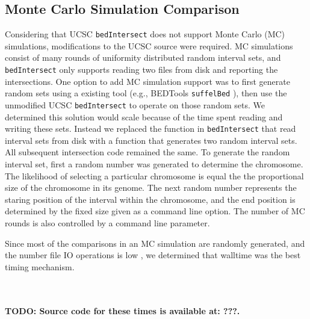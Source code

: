 \subsection{Monte Carlo Simulation Comparison}
Considering that UCSC {\tt bedIntersect} does not support Monte Carlo (MC)
simulations, modifications to the UCSC source were required.  MC simulations
consist of many rounds of uniformity distributed random interval sets, and
{\tt bedIntersect} only supports reading two files from disk and reporting the
intersections.  One option to add MC simulation support was to first generate
random sets using a existing tool (e.g., BEDTools {\tt suffelBed} ), then use
the unmodified UCSC {\tt bedIntersect} to operate on those random sets.  We
determined this solution would scale because of the time spent reading and
writing these sets.  Instead we replaced the function in {\tt bedIntersect} that
read interval sets from disk with a function that generates two random interval
sets.  All subsequent intersection code remained the same.  To generate the
random interval set, first a random number was generated to determine the
chromosome.  The likelihood of selecting a particular chromosome is equal the
the proportional size of the chromosome in its genome.  The next random number
represents the staring position of the interval within the chromosome, and the
end position is determined by the fixed size given as a command line option.
The number of MC rounds is also controlled by a command line parameter.

Since most of the comparisons in an MC simulation are randomly generated, and
the number file IO operations is low , we determined that walltime was the
best timing mechanism.


\\
\\
\textbf{TODO: Source code for these times is available at: ???.}
\\